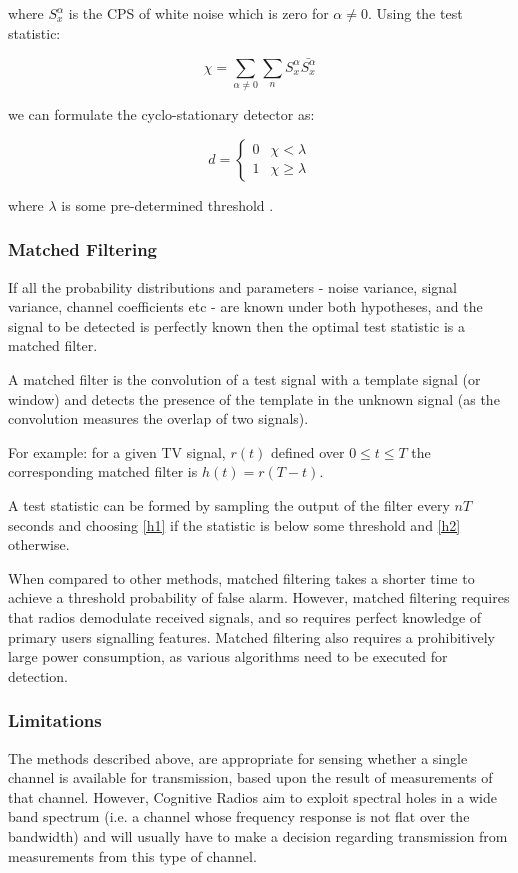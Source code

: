\documentclass[12pt, a4paper]{article}
\newcommand*\conj[1]{\bar{#1}}
\begin{document}
where \(S_{x}^{\alpha}\) is the CPS of white noise which is zero for \(\alpha \neq 0 \).  Using the test statistic:

\begin{equation}
\chi = \sum_{\alpha \neq 0} \sum_{n} S_{x}^{\alpha} \conj{S_{x}^{\alpha}}
\end{equation}

we can formulate the cyclo-stationary detector as:

\begin{equation}
 d =
  \begin{cases}
   0 & \chi < \lambda  \\
   1 & \chi \geq \lambda
  \end{cases}
\end{equation}

where \(\lambda\) is some pre-determined threshold \cite{Ghozzi2006}. 

\subsubsection{Matched Filtering}
If all the probability distributions and parameters  - noise variance, signal variance, channel coefficients etc - are known under both hypotheses, and the signal to be detected is perfectly known then the optimal test statistic is a matched filter.

A matched filter is the convolution of a test signal with a template signal (or window) and detects the presence of the template in the unknown signal (as the convolution measures the overlap of two signals).

For example: for a given TV signal, \(r\left(t\right)\) defined over \(0 \leq t \leq T\) the corresponding matched filter is \(h\left(t\right) = r\left(T - t\right)\). 

A test statistic can be formed by sampling the output of the filter every \(nT\) seconds and choosing \ref{h1} if the statistic is below some threshold and \ref{h2} otherwise.

When compared to other methods, matched filtering takes a shorter time to achieve a threshold probability of false alarm. However, matched filtering requires that radios demodulate received signals, and so requires perfect knowledge of primary users signalling features. Matched filtering also requires a prohibitively large power consumption, as various algorithms need to be executed for detection.

\subsubsection{Limitations}
The methods described above, are appropriate for sensing whether a single channel is available for transmission, based upon the result of measurements of that channel. However, Cognitive Radios aim to exploit spectral holes in a wide band spectrum (i.e. a channel whose frequency response is not flat over the bandwidth) and will usually have to make a decision regarding transmission from measurements from this type of channel.
\end{document}
